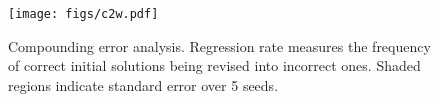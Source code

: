 \begin{figure}[t]
    \centering
    \texttt{[image: figs/c2w.pdf]}
    \vspace{-5mm}
    \caption{Compounding error analysis. Regression rate measures the frequency of correct initial solutions being revised into incorrect ones. Shaded regions indicate standard error over 5 seeds.}
    \label{fig:compounding_error}
\end{figure}
